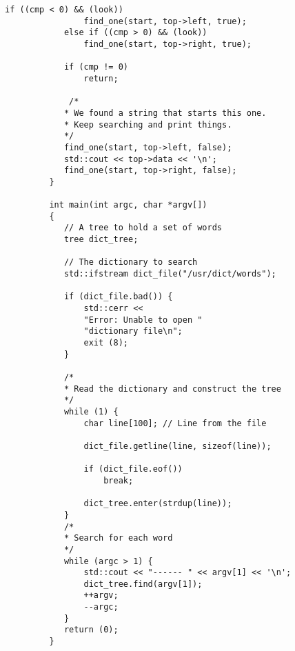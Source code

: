 \begin{LTR}
\begin{lstlisting}[style=C++Style]
         	if ((cmp < 0) && (look))
         		find_one(start, top->left, true);
         	else if ((cmp > 0) && (look))
         		find_one(start, top->right, true);

         	if (cmp != 0)
         		return;

        	 /*
         	* We found a string that starts this one.
         	* Keep searching and print things.
         	*/
         	find_one(start, top->left, false);
         	std::cout << top->data << '\n';
         	find_one(start, top->right, false);
         }

         int main(int argc, char *argv[])
         {
        	// A tree to hold a set of words
         	tree dict_tree;

         	// The dictionary to search
         	std::ifstream dict_file("/usr/dict/words");

         	if (dict_file.bad()) {
         		std::cerr <<
         		"Error: Unable to open "
         		"dictionary file\n";
         		exit (8);
         	}

         	/*
         	* Read the dictionary and construct the tree
         	*/
         	while (1) {
         		char line[100]; // Line from the file

         		dict_file.getline(line, sizeof(line));

         		if (dict_file.eof())
         			break;

         		dict_tree.enter(strdup(line));
         	}
         	/*
         	* Search for each word
         	*/
         	while (argc > 1) {
         		std::cout << "------ " << argv[1] << '\n';
         		dict_tree.find(argv[1]);
         		++argv;
         		--argc;
         	}
         	return (0);
         }
    \end{lstlisting}
\end{LTR}